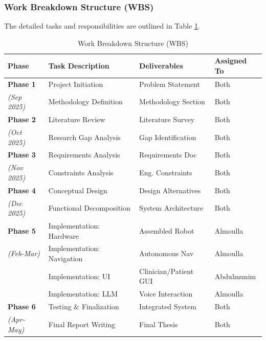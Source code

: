 \subsubsection{Work Breakdown Structure (WBS)}
The detailed tasks and responsibilities are outlined in Table \ref{tab:wbs}.

\begin{table}[H]
\centering
\caption{Work Breakdown Structure (WBS)}
\label{tab:wbs}
\renewcommand{\arraystretch}{1.3}
\begin{tabularx}{\textwidth}{@{}l X l l@{}}
\toprule
\textbf{Phase} & \textbf{Task Description} & \textbf{Deliverables} & \textbf{Assigned To} \\
\midrule

\textbf{Phase 1} & Project Initiation & Problem Statement & Both \\
\textit{(Sep 2025)} & Methodology Definition & Methodology Section & Both \\
\addlinespace[0.5em]

\textbf{Phase 2} & Literature Review & Literature Survey & Both \\
\textit{(Oct 2025)} & Research Gap Analysis & Gap Identification & Both \\
\addlinespace[0.5em]

\textbf{Phase 3} & Requirements Analysis & Requirements Doc & Both \\
\textit{(Nov 2025)} & Constraints Analysis & Eng. Constraints & Both \\
\addlinespace[0.5em]

\textbf{Phase 4} & Conceptual Design & Design Alternatives & Both \\
\textit{(Dec 2025)} & Functional Decomposition & System Architecture & Both \\
\addlinespace[0.5em]

\textbf{Phase 5} & Implementation: Hardware & Assembled Robot & Almoulla \\
\textit{(Feb-Mar)} & Implementation: Navigation & Autonomous Nav & Almoulla \\
 & Implementation: UI & Clinician/Patient GUI & Abdulmunim \\
 & Implementation: LLM & Voice Interaction & Almoulla \\
\addlinespace[0.5em]

\textbf{Phase 6} & Testing \& Finalization & Integrated System & Both \\
\textit{(Apr-May)} & Final Report Writing & Final Thesis & Both \\

\bottomrule
\end{tabularx}
\end{table}
